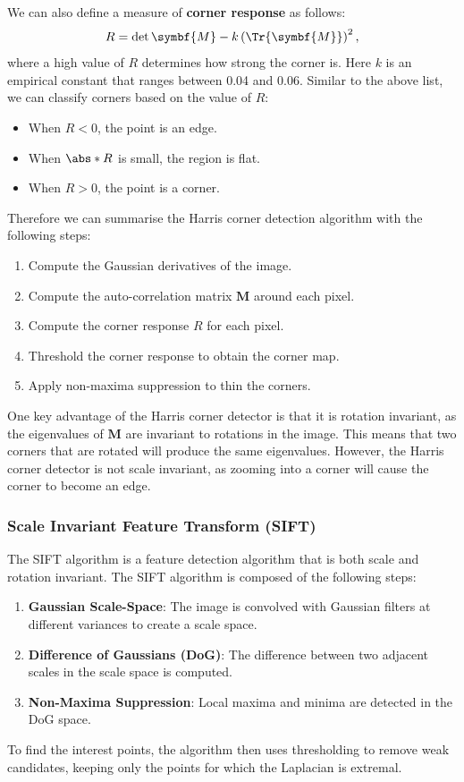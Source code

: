 \documentclass{article}
\begin{document}
We can also define a measure of \textbf{corner response} as follows:
\begin{equation*}
    R = \det{\symbf{M}} - k \left( \Tr{\symbf{M}} \right)^2,
\end{equation*}
where a high value of \(R\) determines how strong the corner is. Here
\(k\) is an empirical constant that ranges between 0.04 and 0.06.
Similar to the above list, we can classify corners based on the value of
\(R\):
\begin{itemize}
    \item When \(R < 0\), the point is an edge.
    \item When \(\abs*{R}\) is small, the region is flat.
    \item When \(R > 0\), the point is a corner.
\end{itemize}
Therefore we can summarise the Harris corner detection algorithm with
the following steps:
\begin{enumerate}
    \item Compute the Gaussian derivatives of the image.
    \item Compute the auto-correlation matrix \(\symbf{M}\) around each
          pixel.
    \item Compute the corner response \(R\) for each pixel.
    \item Threshold the corner response to obtain the corner map.
    \item Apply non-maxima suppression to thin the corners.
\end{enumerate}
One key advantage of the Harris corner detector is that it is rotation
invariant, as the eigenvalues of \(\symbf{M}\) are invariant to
rotations in the image. This means that two corners that are rotated
will produce the same eigenvalues. However, the Harris corner detector
is not scale invariant, as zooming into a corner will cause the corner
to become an edge.
\subsubsection{Scale Invariant Feature Transform (SIFT)}
The SIFT algorithm is a feature detection algorithm that is both scale
and rotation invariant. The SIFT algorithm is composed of the following
steps:
\begin{enumerate}
    \item \textbf{Gaussian Scale-Space}: The image is convolved with
          Gaussian filters at different variances to create a scale
          space.
    \item \textbf{Difference of Gaussians (DoG)}: The difference
          between two adjacent scales in the scale space is computed.
    \item \textbf{Non-Maxima Suppression}: Local maxima and minima are
          detected in the DoG space.
\end{enumerate}
To find the interest points, the algorithm then uses thresholding to
remove weak candidates, keeping only the points for which the Laplacian
is extremal.
\end{document}
